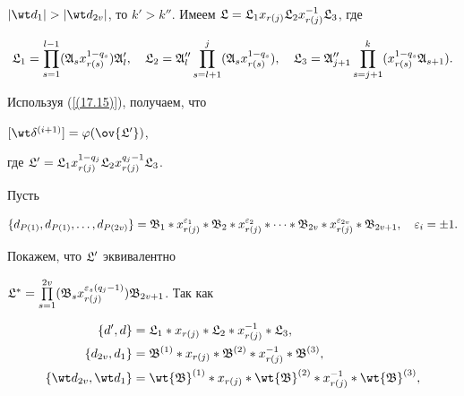 $|\wt d_1|>|\wt d_{2v}|$, то $k'>k''$. Имеем $\frak L=\frak L_1 x_{r(j)}


\frak L_2 x^{-1}_{r(j)}\frak L_3$, где


$$


\frak L_1=\prod^{l-1}_{s=1}(\frak A_s x^{1-q_s}_{r(s)})\frak A'_l,


\quad \frak L_2=\frak A''_l\prod_{s=l+1}^j


(\frak A_s x^{1-q_s}_{r(s)}),\quad \frak L_3=\frak A''_{j +1}


\prod_{s=j+1}^k(x^{1-q_s}_{r(s)}\frak A_{s+1}).


$$


Используя (\ref{(17.15)}), получаем, что


$[\wt\delta^{(i+1)}]=\varphi(\ov{\frak L'})$,


где $\frak L'=\frak L_1 x^{1-q_j}_{r(j)}\frak L_2 x^{q_j-1}_{r(j)}\frak L_3$.





Пусть


$$


\{


d_{P(1)},d_{P(1)},\dotsc,d_{P(2v)}\}=


\frak B_1\ast x_{r(j)}^{\varepsilon_1}\ast


\frak B_2\ast x_{r(j)}^{\varepsilon_2}\ast\dotsb\ast


\frak B_{2v}\ast x_{r(j)}^{\varepsilon_{2v}}\ast\frak B_{2v+1},


\quad\varepsilon_i=\pm 1.


$$


Покажем, что $\frak L'$ эквивалентно


$\frak L^*=\PL_{s=1}^{2v}(\frak B_s x^{\varepsilon_s (q_j-1)}_{r(j)})


\frak B_{2v+1}$. Так как


\begin{align*}


\{d',d\}&=\frak L_1 *x_{r(j)} *\frak L_2*x^{-1}_{r(j)}*\frak L_3,\\


\{d_{2v},d_1\}&=\frak B^{(1)}*x_{r(j)}*


\frak B^{(2)}*x^{-1}_{r(j)}*\frak B^{(3)},\\


\{\wt d_{2v},\wt d_1 \}&=\wt{\frak B}^{(1)}*x_{r(j)} *


\wt{\frak B}^{(2)}*x^{-1}_{r(j)}*\wt{\frak B}^{(3)},


\end{align*}


